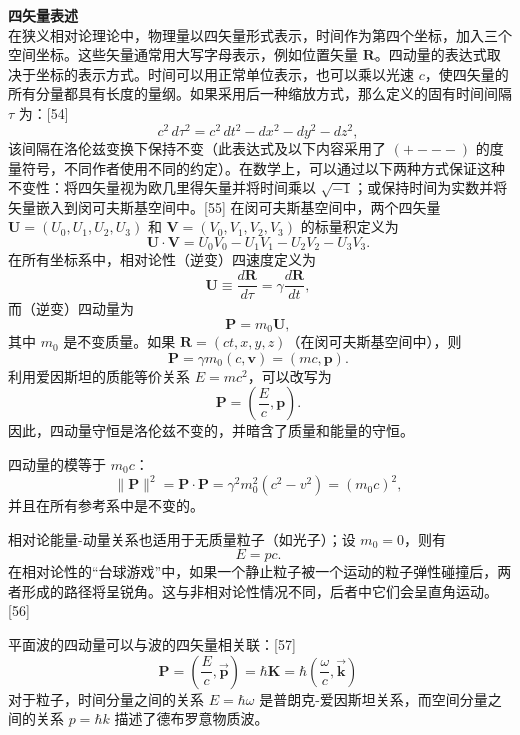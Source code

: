 \textbf{四矢量表述}\\
在狭义相对论理论中，物理量以四矢量形式表示，时间作为第四个坐标，加入三个空间坐标。这些矢量通常用大写字母表示，例如位置矢量 \( \mathbf{R} \)。四动量的表达式取决于坐标的表示方式。时间可以用正常单位表示，也可以乘以光速 \( c \)，使四矢量的所有分量都具有长度的量纲。如果采用后一种缩放方式，那么定义的固有时间间隔 \( \tau \) 为：[54]
\[
c^2 \, d\tau^2 = c^2 \, dt^2 - dx^2 - dy^2 - dz^2,~
\]
该间隔在洛伦兹变换下保持不变（此表达式及以下内容采用了 \( (+ - - -) \) 的度量符号，不同作者使用不同的约定）。在数学上，可以通过以下两种方式保证这种不变性：将四矢量视为欧几里得矢量并将时间乘以 \( \sqrt{-1} \)；或保持时间为实数并将矢量嵌入到闵可夫斯基空间中。[55] 在闵可夫斯基空间中，两个四矢量 \( \mathbf{U} = (U_0, U_1, U_2, U_3) \) 和 \( \mathbf{V} = (V_0, V_1, V_2, V_3) \) 的标量积定义为
\[
\mathbf{U} \cdot \mathbf{V} = U_0 V_0 - U_1 V_1 - U_2 V_2 - U_3 V_3.~
\]
在所有坐标系中，相对论性（逆变）四速度定义为
\[
\mathbf{U} \equiv \frac{d\mathbf{R}}{d\tau} = \gamma \frac{d\mathbf{R}}{dt},~
\]
而（逆变）四动量为
\[
\mathbf{P} = m_0 \mathbf{U},~
\]
其中 \( m_0 \) 是不变质量。如果 \( \mathbf{R} = (ct, x, y, z) \)（在闵可夫斯基空间中），则
\[
\mathbf{P} = \gamma m_0 \left(c, \mathbf{v}\right) = (mc, \mathbf{p}).~
\]
利用爱因斯坦的质能等价关系 \( E = mc^2 \)，可以改写为
\[
\mathbf{P} = \left(\frac{E}{c}, \mathbf{p}\right).~
\]
因此，四动量守恒是洛伦兹不变的，并暗含了质量和能量的守恒。

四动量的模等于 \( m_0 c \)：
\[
\|\mathbf{P}\|^2 = \mathbf{P} \cdot \mathbf{P} = \gamma^2 m_0^2 \left(c^2 - v^2\right) = (m_0 c)^2,~
\]
并且在所有参考系中是不变的。

相对论能量-动量关系也适用于无质量粒子（如光子）；设 \( m_0 = 0 \)，则有
\[
E = pc.~
\]
在相对论性的“台球游戏”中，如果一个静止粒子被一个运动的粒子弹性碰撞后，两者形成的路径将呈锐角。这与非相对论性情况不同，后者中它们会呈直角运动。[56]

平面波的四动量可以与波的四矢量相关联：[57]
\[
\mathbf{P} = \left(\frac{E}{c}, \vec{\mathbf{p}}\right) = \hbar \mathbf{K} = \hbar \left(\frac{\omega}{c}, \vec{\mathbf{k}}\right)~
\]
对于粒子，时间分量之间的关系 \( E = \hbar \omega \) 是普朗克-爱因斯坦关系，而空间分量之间的关系 \( p = \hbar k \) 描述了德布罗意物质波。